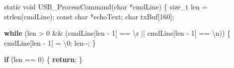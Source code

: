 \documentclass[
  chinese,
  UTF8,
  oneside,
  openany]{ctexbook}
\newenvironment{Shaded}{}{}
\newcommand{\CharTok}[1]{\textcolor[rgb]{0.25,0.44,0.63}{#1}}
\newcommand{\ControlFlowTok}[1]{\textcolor[rgb]{0.00,0.44,0.13}{\textbf{#1}}}
\newcommand{\DataTypeTok}[1]{\textcolor[rgb]{0.56,0.13,0.00}{#1}}
\newcommand{\DecValTok}[1]{\textcolor[rgb]{0.25,0.63,0.44}{#1}}
\newcommand{\NormalTok}[1]{#1}
\newcommand{\OperatorTok}[1]{\textcolor[rgb]{0.40,0.40,0.40}{#1}}
\newcommand{\SpecialCharTok}[1]{\textcolor[rgb]{0.25,0.44,0.63}{#1}}
\begin{document}
\begin{Shaded}
\begin{Highlighting}[]
\DataTypeTok{static} \DataTypeTok{void}\NormalTok{ USB\_ProcessCommand}\OperatorTok{(}\DataTypeTok{char} \OperatorTok{*}\NormalTok{cmdLine}\OperatorTok{)}
\OperatorTok{\{}
    \DataTypeTok{size\_t}\NormalTok{ len }\OperatorTok{=}\NormalTok{ strlen}\OperatorTok{(}\NormalTok{cmdLine}\OperatorTok{);}
    \DataTypeTok{const} \DataTypeTok{char} \OperatorTok{*}\NormalTok{echoText}\OperatorTok{;}
    \DataTypeTok{char}\NormalTok{ txBuf}\OperatorTok{[}\DecValTok{160}\OperatorTok{];}

    \ControlFlowTok{while} \OperatorTok{(}\NormalTok{len }\OperatorTok{\textgreater{}} \DecValTok{0} \OperatorTok{\&\&} \OperatorTok{(}\NormalTok{cmdLine}\OperatorTok{[}\NormalTok{len }\OperatorTok{{-}} \DecValTok{1}\OperatorTok{]} \OperatorTok{==} \CharTok{\textquotesingle{}}\SpecialCharTok{\textbackslash{}r}\CharTok{\textquotesingle{}} \OperatorTok{||}\NormalTok{ cmdLine}\OperatorTok{[}\NormalTok{len }\OperatorTok{{-}} \DecValTok{1}\OperatorTok{]} \OperatorTok{==} \CharTok{\textquotesingle{}}\SpecialCharTok{\textbackslash{}n}\CharTok{\textquotesingle{}}\OperatorTok{))}
    \OperatorTok{\{}
\NormalTok{        cmdLine}\OperatorTok{[}\NormalTok{len }\OperatorTok{{-}} \DecValTok{1}\OperatorTok{]} \OperatorTok{=} \CharTok{\textquotesingle{}}\SpecialCharTok{\textbackslash{}0}\CharTok{\textquotesingle{}}\OperatorTok{;}
\NormalTok{        len}\OperatorTok{{-}{-};}
    \OperatorTok{\}}

    \ControlFlowTok{if} \OperatorTok{(}\NormalTok{len }\OperatorTok{==} \DecValTok{0}\OperatorTok{)}
    \OperatorTok{\{}
        \ControlFlowTok{return}\OperatorTok{;}
    \OperatorTok{\}}


\end{Highlighting}
\end{Shaded}
\end{document}
